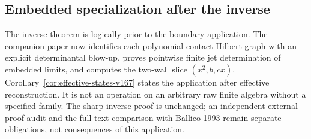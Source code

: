 \documentclass[11pt,reqno]{amsart}
\numberwithin{equation}{section}
\theoremstyle{definition}\newtheorem{definition}[theorem]{Definition}
\theoremstyle{remark}\newtheorem{remark}[theorem]{Remark}
\begin{document}
\subsection{Embedded specialization after the inverse}
The inverse theorem is logically prior to the boundary application.
The companion paper now identifies each polynomial contact Hilbert
graph with an explicit determinantal blow-up, proves pointwise finite
jet determination of embedded limits, and computes the two-wall
slice $(x^2,b,cx)$. Corollary~\ref{cor:effective-states-v167}
states the application after effective reconstruction. It is not an
operation on an arbitrary raw finite algebra without a specified
family. The sharp-inverse proof is unchanged; an independent external
proof audit and the full-text comparison with Ballico 1993 remain
separate obligations, not consequences of this application.
\end{document}
